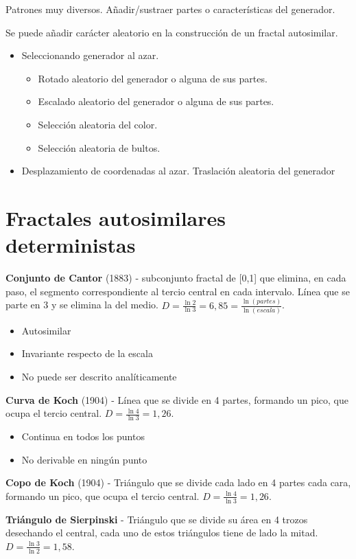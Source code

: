 Patrones muy diversos. Añadir/sustraer partes o características del generador.

Se puede añadir carácter aleatorio en la construcción de un fractal autosimilar.
\begin{itemize}
    \item Seleccionando generador al azar.
    \begin{itemize}
        \item Rotado aleatorio del generador o alguna de sus partes.
        \item Escalado aleatorio del generador o alguna de sus partes.
        \item Selección aleatoria del color.
        \item Selección aleatoria de bultos.
    \end{itemize}
    \item Desplazamiento de coordenadas al azar. Traslación aleatoria del generador
\end{itemize}

\section{Fractales autosimilares deterministas}
\textbf{Conjunto de Cantor} (1883) - subconjunto fractal de [0,1] que elimina, en cada paso, el segmento correspondiente al tercio central en cada intervalo. Línea que se parte en 3 y se elimina la del medio. $D=\frac{\ln 2}{\ln 3}= 6,85=\frac{\ln (partes)}{\ln (escala)}$.
\begin{itemize}
    \item Autosimilar
    \item Invariante respecto de la escala
    \item No puede ser descrito analíticamente
\end{itemize}

\textbf{Curva de Koch} (1904) - Línea que se divide en 4 partes, formando un pico, que ocupa el tercio central. $D=\frac{\ln 4}{\ln 3}=1,26$.
\begin{itemize}
    \item Continua en todos los puntos
    \item No derivable en ningún punto
\end{itemize}

\textbf{Copo de Koch} (1904) - Triángulo que se divide cada lado en 4 partes cada cara, formando un pico, que ocupa el tercio central. $D=\frac{\ln 4}{\ln 3}=1,26$.

\textbf{Triángulo de Sierpinski} - Triángulo que se divide su área en 4 trozos desechando el central, cada uno de estos triángulos tiene de lado la mitad. $D=\frac{\ln 3}{\ln 2}=1,58$.

